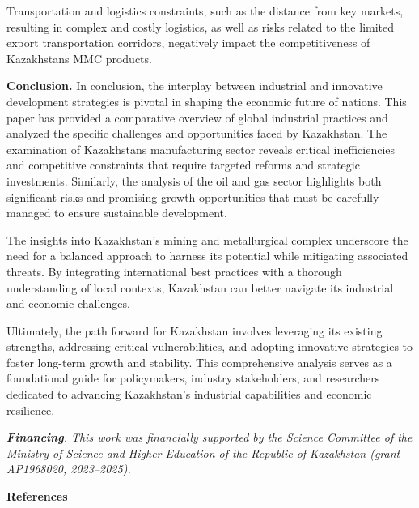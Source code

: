 \begin{multicols}{2}
Transportation and logistics constraints, such as the distance from key
markets, resulting in complex and costly logistics, as well as risks
related to the limited export transportation corridors, negatively
impact the competitiveness of Kazakhstan\textquotesingle s MMC products.

{\bfseries Conclusion.} In conclusion, the interplay between industrial and
innovative development strategies is pivotal in shaping the economic
future of nations. This paper has provided a comparative overview of
global industrial practices and analyzed the specific challenges and
opportunities faced by Kazakhstan. The examination of
Kazakhstan\textquotesingle s manufacturing sector reveals critical
inefficiencies and competitive constraints that require targeted reforms
and strategic investments. Similarly, the analysis of the oil and gas
sector highlights both significant risks and promising growth
opportunities that must be carefully managed to ensure sustainable
development.

The insights into Kazakhstan's mining and metallurgical complex
underscore the need for a balanced approach to harness its potential
while mitigating associated threats. By integrating international best
practices with a thorough understanding of local contexts, Kazakhstan
can better navigate its industrial and economic challenges.

Ultimately, the path forward for Kazakhstan involves leveraging its
existing strengths, addressing critical vulnerabilities, and adopting
innovative strategies to foster long-term growth and stability. This
comprehensive analysis serves as a foundational guide for policymakers,
industry stakeholders, and researchers dedicated to advancing
Kazakhstan's industrial capabilities and economic resilience.

\emph{{\bfseries Financing}. This work was financially supported by the
Science Committee of the Ministry of Science and Higher Education of the
Republic of Kazakhstan (grant AP1968020, 2023--2025).}
\end{multicols}

\begin{center}
{\bfseries References}
\end{center}



